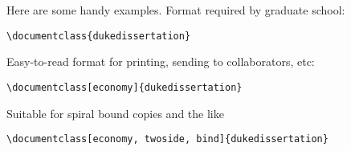 Here are some handy examples. Format required by graduate school:

\begin{verbatim}
\documentclass{dukedissertation}
\end{verbatim}

Easy-to-read format for printing, sending to collaborators, etc:

\begin{verbatim}
\documentclass[economy]{dukedissertation}
\end{verbatim}

Suitable for spiral bound copies and the like

\begin{verbatim}
\documentclass[economy, twoside, bind]{dukedissertation}
\end{verbatim}
